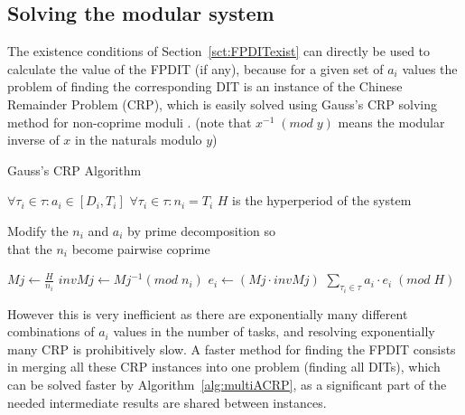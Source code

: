 \documentclass[conference]{IEEEtran}
\begin{document}
	\subsection{Solving the modular system}
		The existence conditions of	Section~\ref{sct:FPDITexist} can directly be used to calculate the value of
		the FPDIT (if any), because for a given set of $a_i$ values the problem of
		finding the corresponding DIT is an instance of the Chinese Remainder Problem
		(CRP), which is easily solved using Gauss's CRP solving method for non-coprime
		moduli \cite{gauss1965disquisitiones}. (note that $x^{-1} \; (mod \; y)$
		means the modular inverse of $x$ in the naturals modulo $y$)

		\begin{algorithm}
			\caption{Gauss's CRP Algorithm}
			\label{alg:algoCRP}
			\begin{algorithmic}[1]
				\REQUIRE $\forall \tau_i \in \tau : a_i \in [D_i,T_i]$
				\REQUIRE $\forall \tau_i \in \tau : n_i = T_i$
				\REQUIRE $H$ is the hyperperiod of the system

				\STATE Modify the $n_i$ and $a_i$ by prime decomposition so \\ that the
				$n_i$ become pairwise coprime

					\STATE $Mj \leftarrow \frac{H}{n_i}$
					\STATE $invMj \leftarrow Mj^{-1} (mod \; n_i)$
					\STATE $e_i \leftarrow (Mj \cdot invMj)$
				\ENDFOR
				\RETURN $\sum\limits_{\tau_i \in \tau}{a_i \cdot e_i} \; (mod \; H)$
			\end{algorithmic}
		\end{algorithm}


		However this is very inefficient as there are exponentially many different
		combinations of $a_i$ values in the number of tasks, and resolving
		exponentially many CRP is prohibitively slow. A faster method for finding
		the FPDIT consists in merging all these CRP instances into one problem
		(finding all DITs), which can be solved faster by
		Algorithm~\ref{alg:multiACRP}, as a significant part of the needed
		intermediate results are shared between instances.

\end{document}
